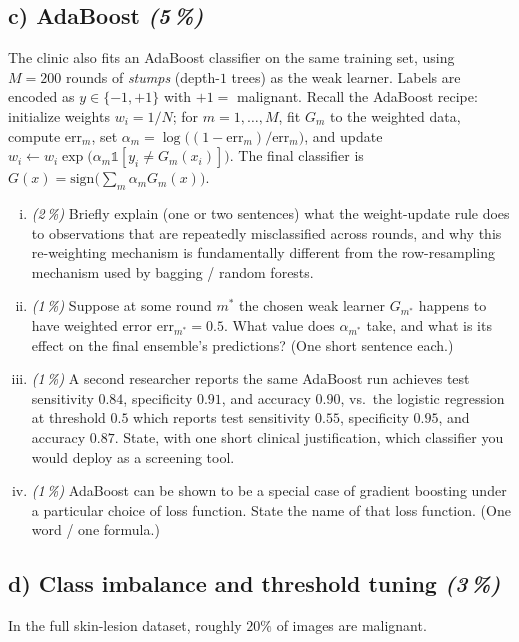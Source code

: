 \documentclass[11pt,a4paper]{article}
\newcommand{\subpoints}[1]{\textit{(#1\,\%)}}
\begin{document}
\subsection*{c) AdaBoost \subpoints{5}}

The clinic also fits an AdaBoost classifier on the same training set, using $M = 200$ rounds of \emph{stumps} (depth-$1$ trees) as the weak learner. Labels are encoded as $y \in \{-1, +1\}$ with $+1 =$ malignant. Recall the AdaBoost recipe: initialize weights $w_i = 1/N$; for $m = 1, \dots, M$, fit $G_m$ to the weighted data, compute $\mathrm{err}_m$, set $\alpha_m = \log\big((1-\mathrm{err}_m)/\mathrm{err}_m\big)$, and update $w_i \leftarrow w_i \exp\!\big(\alpha_m \mathbb{1}[y_i \neq G_m(x_i)]\big)$. The final classifier is $G(x) = \mathrm{sign}\!\big(\sum_m \alpha_m G_m(x)\big)$.

\begin{enumerate}[(i)]
  \item \subpoints{2} Briefly explain (one or two sentences) what the weight-update rule does to observations that are repeatedly misclassified across rounds, and why this re-weighting mechanism is fundamentally different from the row-resampling mechanism used by bagging / random forests.
  \item \subpoints{1} Suppose at some round $m^*$ the chosen weak learner $G_{m^*}$ happens to have weighted error $\mathrm{err}_{m^*} = 0.5$. What value does $\alpha_{m^*}$ take, and what is its effect on the final ensemble's predictions? (One short sentence each.)
  \item \subpoints{1} A second researcher reports the same AdaBoost run achieves test sensitivity $0.84$, specificity $0.91$, and accuracy $0.90$, vs.\ the logistic regression at threshold $0.5$ which reports test sensitivity $0.55$, specificity $0.95$, and accuracy $0.87$. State, with one short clinical justification, which classifier you would deploy as a screening tool.
  \item \subpoints{1} AdaBoost can be shown to be a special case of gradient boosting under a particular choice of loss function. State the name of that loss function. (One word / one formula.)
\end{enumerate}

\subsection*{d) Class imbalance and threshold tuning \subpoints{3}}

In the full skin-lesion dataset, roughly $20\%$ of images are malignant.
\end{document}
